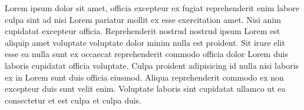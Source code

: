 


Lorem ipsum dolor sit amet, officia excepteur ex fugiat reprehenderit enim labore culpa sint ad nisi Lorem pariatur mollit ex esse exercitation amet.
Nisi anim cupidatat excepteur officia.
Reprehenderit nostrud nostrud ipsum Lorem est aliquip amet voluptate voluptate dolor minim nulla est proident.
Sit irure elit esse ea nulla sunt ex occaecat reprehenderit commodo officia dolor Lorem duis laboris cupidatat officia voluptate.
Culpa proident adipisicing id nulla nisi laboris ex in Lorem sunt duis officia eiusmod.
Aliqua reprehenderit commodo ex non excepteur duis sunt velit enim.
Voluptate laboris sint cupidatat ullamco ut ea consectetur et est culpa et culpa duis.

